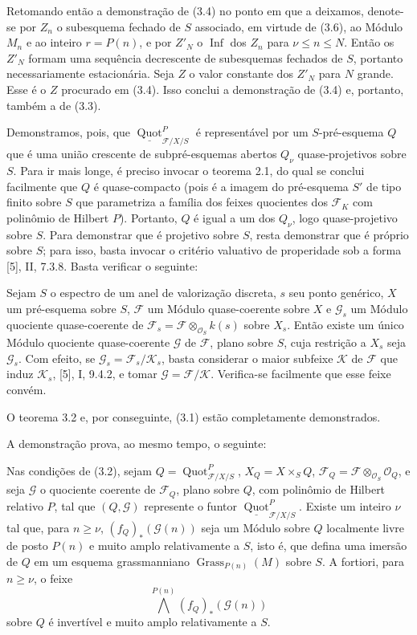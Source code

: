 Retomando então a demonstração de (3.4) no ponto em que a deixamos, denote-se
por $Z_n$ o subesquema fechado de $S$ associado, em virtude de (3.6), ao
Módulo $M_n$ e ao inteiro $r=P(n)$, e por $Z'_N$ o
$\operatorname{Inf}$ dos $Z_n$ para $\nu\leq n\leq N$. Então os $Z'_N$
formam uma sequência decrescente de subesquemas fechados de $S$, portanto
necessariamente estacionária. Seja $Z$ o valor constante dos $Z'_N$ para $N$
grande. Esse é o $Z$ procurado em (3.4). Isso conclui a demonstração de (3.4)
e, portanto, também a de (3.3).

Demonstramos, pois, que
$\underline{\operatorname{Quot}}^P_{\mathcal F/X/S}$ é representável por um
$S$-pré-esquema $Q$ que é uma união crescente de subpré-esquemas abertos
$Q_\nu$ quase-projetivos sobre $S$. Para ir mais longe, é preciso invocar o
teorema 2.1, do qual se conclui facilmente que $Q$ é quase-compacto (pois é a
imagem do pré-esquema $S'$ de tipo finito sobre $S$ que parametriza a família
dos feixes quocientes dos $\mathcal F_K$ com polinômio de Hilbert $P$).
Portanto, $Q$ é igual a um dos $Q_\nu$, logo quase-projetivo sobre $S$. Para
demonstrar que é projetivo sobre $S$, resta demonstrar que é próprio sobre
$S$; para isso, basta invocar o critério valuativo de properidade sob a forma
[5], II, 7.3.8. Basta verificar o seguinte:

 Sejam $S$ o espectro de um anel de valorização discreta,
$s$ seu ponto genérico, $X$ um pré-esquema sobre $S$, $\mathcal F$ um Módulo
quase-coerente sobre $X$ e $\mathcal G_s$ um Módulo quociente quase-coerente
de $\mathcal F_s=\mathcal F\otimes_{\mathcal O_S}k(s)$ sobre $X_s$. Então
existe um único Módulo quociente quase-coerente $\mathcal G$ de $\mathcal F$,
plano sobre $S$, cuja restrição a $X_s$ seja $\mathcal G_s$.
Com efeito, se $\mathcal G_s=\mathcal F_s/\mathcal K_s$, basta considerar o
maior subfeixe $\mathcal K$ de $\mathcal F$ que induz $\mathcal K_s$, [5],
I, 9.4.2, e tomar $\mathcal G=\mathcal F/\mathcal K$. Verifica-se facilmente
que esse feixe convém.

O teorema 3.2 e, por conseguinte, (3.1) estão completamente demonstrados.

A demonstração prova, ao mesmo tempo, o seguinte:

 Nas condições de (3.2), sejam
$Q=\operatorname{Quot}^P_{\mathcal F/X/S}$, $X_Q=X\times_SQ$,
$\mathcal F_Q=\mathcal F\otimes_{\mathcal O_S}\mathcal O_Q$, e seja
$\mathcal G$ o quociente coerente de $\mathcal F_Q$, plano sobre $Q$, com
polinômio de Hilbert relativo $P$, tal que $(Q,\mathcal G)$ represente o
funtor $\underline{\operatorname{Quot}}^P_{\mathcal F/X/S}$. Existe um
inteiro $\nu$ tal que, para $n\geq\nu$,
$(f_Q)_*(\mathcal G(n))$ seja um Módulo sobre $Q$ localmente livre de posto
$P(n)$ e muito amplo relativamente a $S$, isto é, que defina uma imersão de
$Q$ em um esquema grassmanniano $\operatorname{Grass}_{P(n)}(M)$ sobre $S$.
A fortiori, para $n\geq\nu$, o feixe
\[
\bigwedge^{P(n)}(f_Q)_*(\mathcal G(n))
\]
sobre $Q$ é invertível e muito amplo relativamente a $S$.

